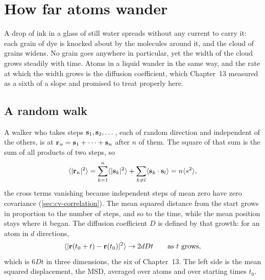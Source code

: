 \section{How far atoms wander}
\label{sec:ob-msd}

A drop of ink in a glass of still water spreads without any current to
carry it: each grain of dye is knocked about by the molecules around it,
and the cloud of grains widens. No grain goes anywhere in particular, yet
the width of the cloud grows steadily with time. Atoms in a liquid wander
in the same way, and the rate at which the width grows is the diffusion
coefficient, which Chapter~13 measured as a sixth of a slope and promised
to treat properly here.

\subsection*{A random walk}

A walker who takes steps $\bm{\mathrm{s}}_1, \bm{\mathrm{s}}_2, \dots$, each of random
direction and independent of the others, is at $\bm{\mathrm{r}}_n = \bm{\mathrm{s}}_1 +
\dots + \bm{\mathrm{s}}_n$ after $n$ of them. The square of that sum is the sum of
all products of two steps, so
\begin{equation*}
   \langle \lvert\bm{\mathrm{r}}_n\rvert^2 \rangle
   = \sum_{k=1}^n\langle \lvert\bm{\mathrm{s}}_k\rvert^2 \rangle
   + \sum_{k\neq l}\langle \bm{\mathrm{s}}_k\cdot\bm{\mathrm{s}}_l \rangle
   = n\langle s^2 \rangle ,
\end{equation*}
the cross terms vanishing because independent steps of mean zero have
zero covariance (\cref{sec:cv-correlation}). The mean squared distance
from the start grows in proportion to the number of steps, and so to the
time, while the mean position stays where it began. The diffusion
coefficient $D$ is defined by that growth: for an atom in $d$ directions,
\begin{equation}
   \langle \lvert\bm{\mathrm{r}}(t_0 + t) - \bm{\mathrm{r}}(t_0)\rvert^2 \rangle \to 2dDt
   \qquad \text{as $t$ grows},
   \label{eq:ob-einstein}
\end{equation}
which is $6Dt$ in three dimensions, the six of Chapter~13. The left side is
the mean squared displacement, the MSD, averaged over atoms and over
starting times $t_0$.

